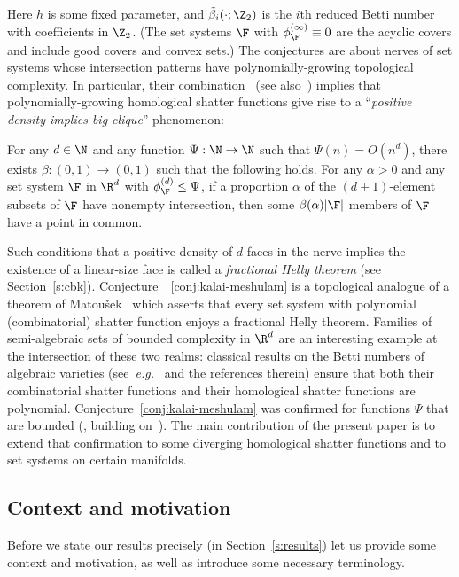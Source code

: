 %
\noindent
Here $h$ is some fixed parameter, and $\tilde\beta_i(\cdot;\Z_2)$ is the $i$th reduced Betti number with coefficients in $\Z_2$. (The set systems $\F$ with $\phi_{\F}^{(\infty)} \equiv 0$ are the acyclic covers and include good covers and convex sets.) The  conjectures are about nerves of set systems whose intersection patterns have polynomially-growing topological complexity. In particular, their combination~\cite[Conjectures~6~and~7]{KM} (see also~\cite[Conjecture~1.9]{steppingUp}) implies that polynomially-growing homological shatter functions give rise to a ``\emph{positive density implies big clique}'' phenomenon:
%
\begin{conjecture}
    \label{conj:kalai-meshulam}
    For any $d \in \N$ and any function $\Psi: \N \to \N$ such that $\Psi(n) = O(n^d)$, there exists $\beta: (0,1) \to (0,1)$ such that the following holds. For any $\alpha>0$ and any set system $\F$ in $\R^d$ with $\phi_{\F}^{(d)} \le \Psi$, if a proportion $\alpha$ of the $(d+1)$-element subsets of $\F$ have nonempty intersection, then some $\beta(\alpha)|\F|$ members of $\F$ have a point in common.
\end{conjecture}
%
\noindent
Such conditions that a positive density of $d$-faces in the nerve implies the existence of a linear-size face is called a \emph{fractional Helly theorem} (see Section~\ref{s:cbk}).
%
\medskip
%
Conjecture~~\ref{conj:kalai-meshulam} is a topological analogue of a theorem of Matou\v sek~\cite{matousek2004bounded} which asserts that every set system with polynomial (combinatorial) shatter function enjoys a fractional Helly theorem. Families of semi-algebraic sets of bounded complexity in $\R^d$ are an interesting example at the intersection of these two realms: classical results on the Betti numbers of algebraic varieties (see~\emph{e.g.}~\cite{basu2018multi} and the references therein) ensure that both their combinatorial shatter functions and their homological shatter functions are polynomial.
%
\medskip
%
Conjecture~\ref{conj:kalai-meshulam} was confirmed for functions $\Psi$ that are bounded (\cite[Corollary~1.3]{steppingUp}, building on~\cite{Holmsen2020,Holmsen2021,patakova2022bounding}). The main contribution of the present paper is to extend that confirmation to some diverging homological shatter functions and to set systems on certain manifolds. 
%
%
\subsection{Context and motivation}\label{s:context}
%
Before we state our results precisely (in Section~\ref{s:results}) let us provide some context and motivation, as well as introduce some necessary terminology.
%
%

